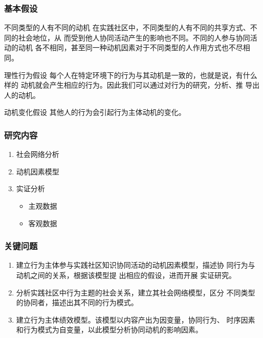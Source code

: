 \documentclass[slidestop,compress,mathserif,blue,compress]{beamer}
\begin{document}
\begin{frame}
  \begin{tabular}{|c|c|c|}
    
  \end{tabular}
\end{frame}

\begin{frame}
  \frametitle{基本假设}
\vfill
  \begin{block}{不同类型的人有不同的动机}
     在实践社区中，不同类型的人有不同的共享方式、不同的社会地位，从
     而受到他人协同活动产生的影响也不同。不同的人参与协同活动的动机
    各不相同，甚至同一种动机因素对于不同类型的人作用方式也不尽相同。
  \end{block}
  \begin{block}{理性行为假设}
    每个人在特定环境下的行为与其动机是一致的，也就是说，有什么样的
    动机就会产生相应的行为。因此我们可以通过对行为的研究，分析、推
    导出人的动机。
  \end{block}
  \begin{block}{动机变化假设}
    其他人的行为会引起行为主体动机的变化。
  \end{block}
\end{frame}
\vfill
\begin{frame}
  \frametitle{研究内容}
  
  \begin{enumerate}
  \vfill
   \pause \item 社会网络分析
   \pause \item  动机因素模型
   \pause \item  实证分析
   \begin{itemize}
   \item 主观数据
    \item  客观数据
   \end{itemize}
 \vfill
  \end{enumerate}
\end{frame}

\begin{frame}
  \frametitle{关键问题}
  \begin{enumerate}
\item 建立行为主体参与实践社区知识协同活动的动机因素模型，描述协
           同行为与动机之间的关系，根据该模型提 出相应的假设，进而开展
           实证研究。
\item  分析实践社区中行为主题的社会关系，建立其社会网络模型，区分
            不同类型的协同者，描述出其不同的行为模式。
\item 建立行为主体绩效模型。该模型以内容产出为因变量，协同行为、
            时序因素和行为模式为自变量，以此模型分析协同动机的影响因素。
\end{enumerate}
\end{frame}
\end{document}

